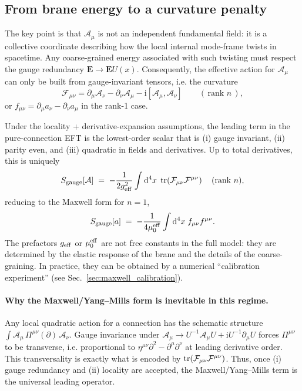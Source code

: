\documentclass[11pt,a4paper]{article}
\providecommand{\dd}{\mathrm{d}}
\providecommand{\ii}{\mathrm{i}}
\newcommand{\bbA}{\mathcal{A}}              %
\newcommand{\bbF}{\mathcal{F}}              %
\begin{document}
\subsection{From brane energy to a curvature penalty}
The key point is that \(\bbA_\mu\) is not an independent fundamental field: it is a collective coordinate describing
how the local internal mode-frame twists in spacetime. Any coarse-grained energy associated with such twisting must respect
the gauge redundancy \(\mathbf{E}\to \mathbf{E}U(x)\).
Consequently, the effective action for \(\bbA_\mu\) can only be built from gauge-invariant tensors, i.e.
the curvature
\begin{equation}
\bbF_{\mu\nu} = \partial_\mu \bbA_\nu - \partial_\nu \bbA_\mu - \ii[\bbA_\mu,\bbA_\nu]
\qquad (\,\text{rank }n\,),
\label{eq:curvature_def}
\end{equation}
or \(f_{\mu\nu}=\partial_\mu a_\nu-\partial_\nu a_\mu\) in the rank-1 case.

Under the locality + derivative-expansion assumptions, the leading term in the pure-connection EFT is the lowest-order
scalar that is (i) gauge invariant, (ii) parity even, and (iii) quadratic in fields and derivatives. Up to total derivatives,
this is uniquely
\begin{equation}
S_{\rm gauge}[\bbA]\;=\;-\frac{1}{2g_{\rm eff}^2}\int \dd^4x\;\tr\!\left(\bbF_{\mu\nu}\bbF^{\mu\nu}\right)
\quad\text{(rank \(n\))},
\label{eq:Seff_YM}
\end{equation}
reducing to the Maxwell form for \(n=1\),
\begin{equation}
S_{\rm gauge}[a]\;=\;-\frac{1}{4\mu_0^{\rm eff}}\int \dd^4x\; f_{\mu\nu}f^{\mu\nu}.
\label{eq:Seff_Maxwell}
\end{equation}
The prefactors \(g_{\rm eff}\) or \(\mu_0^{\rm eff}\) are not free constants in the full model: they are determined by the
elastic response of the brane and the details of the coarse-graining. In practice, they can be obtained by a numerical ``calibration experiment''
(see Sec.~\ref{sec:maxwell_calibration}).

\paragraph{Why the Maxwell/Yang--Mills form is inevitable in this regime.}
Any local quadratic action for a connection has the schematic structure
\(\int \bbA_\mu\,\Pi^{\mu\nu}(\partial)\,\bbA_\nu\).
Gauge invariance under \(\bbA_\mu\to U^{-1}\bbA_\mu U + \ii U^{-1}\partial_\mu U\) forces \(\Pi^{\mu\nu}\) to be transverse,
i.e. proportional to \(\eta^{\mu\nu}\partial^2-\partial^\mu\partial^\nu\) at leading derivative order.
This transversality is exactly what is encoded by \(\tr(\bbF_{\mu\nu}\bbF^{\mu\nu})\).
Thus, once (i) gauge redundancy and (ii) locality are accepted, the Maxwell/Yang--Mills term is the universal leading operator.
\end{document}
